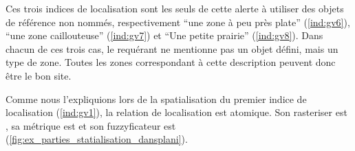 Ces trois indices de localisation sont les seuls de cette alerte à
utiliser des objets de référence non nommés, respectivement
\enquote{une zone à peu près plate} (\ref{ind:gv6}), \enquote{une zone
  caillouteuse} (\ref{ind:gv7}) et \enquote{Une petite prairie}
(\ref{ind:gv8}). Dans chacun de ces trois cas, le requérant ne
mentionne pas un objet défini, mais un type de zone. Toutes les zones
correspondant à cette description peuvent donc être le bon site.

Comme nous l’expliquions lors de la spatialisation du premier indice
de localisation (\ref{ind:gv1}), la relation de localisation
 est atomique. Son rasteriser est
, sa métrique est  et son
fuzzyficateur est 
(\autoref{fig:ex_parties_statialisation_dansplani}).

